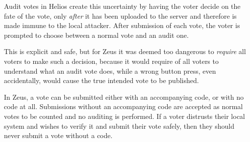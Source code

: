 \documentclass[letterpaper,10pt]{article}
\begin{document}
Audit votes in Helios create this uncertainty by having the voter decide
on the fate of the vote, only \emph{after} it has been uploaded to the
server and therefore is made immune to the local attacker.
After submission of each vote, the voter is prompted to choose
between a normal vote and an audit one.

This is explicit and safe, but for Zeus it was deemed too dangerous to
\emph{require} all voters to make such a decision, because it would
require of all voters to understand what an audit vote does,
while a wrong button press, even accidentally,
would cause the true intended vote to be published.

In Zeus, a vote can be submitted either with an accompanying code,
or with no code at all.
Submissions without an accompanying code are accepted
as normal votes to be counted and no auditing is performed.
If a voter distrusts their local system and wishes to verify it
and submit their vote safely, then they should never submit
a vote without a code.
\end{document}
